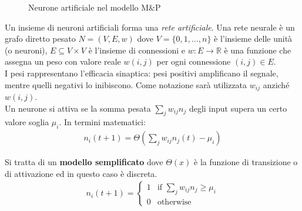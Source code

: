 \begin{figure}[h!]
    \centering
    \caption{Neurone artificiale nel modello M\&P}
\end{figure}

Un insieme di neuroni artificiali forma una \emph{rete artificiale}. Una rete neurale è un grafo diretto pesato $N=(V,E,w)$ dove $V=\{ 0,1,\dots, n\}$ è l'insieme delle unità (o neuroni), $E \subseteq V \times V$ è l'insieme di connessioni e $w:E \rightarrow \mathbb{R}$ è una funzione che assegna un peso con valore reale $w(i,j)$ per ogni connessione $(i,j)\in E$.\\

I pesi rappresentano l'efficacia sinaptica: pesi positivi amplificano il segnale, mentre quelli negativi lo inibiscono. Come notazione sarà utilizzata $w_{ij}$ anziché $w(i,j)$.\\

Un neurone si attiva se la somma pesata $\sum_j w_{ij} n_j$ degli input supera un certo valore soglia $\mu_i$. In termini matematici:
\begin{align}
    n_i(t + 1) = \Theta\left(\sum_j w_{ij} n_j(t) - \mu_i \right)
\end{align}

\newpage

Si tratta di un \textbf{modello semplificato} dove $\Theta(x)$ è la funzione di transizione o di attivazione ed in questo caso è discreta.
\begin{align}
    n_i(t + 1) =
    \begin{cases}
        1 & \mbox{if } \displaystyle\sum_j w_{ij} n_j \geq \mu_i \\
        0 & \mbox{otherwise} 
    \end{cases}
\end{align}

